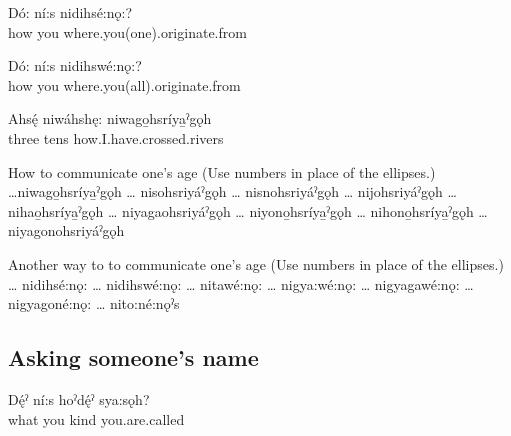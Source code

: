 \ea 
\gll Dó: ní:s nidihsé:nǫ:?\\
how you where.you(one).originate.from\\
\glt {}
\z 

\ea  
\gll Dó: ní:s nidihswé:nǫ:?\\
how you where.you(all).originate.from\\
\glt {}
\z 

\ea  
\gll Ahsę́ niwáhshę: niwago̱hsríya̱ˀgǫh\\
three tens how.I.have.crossed.rivers\\
\glt {}
\z 




\ea How to communicate one's age (Use numbers in place of the ellipses.)\\
\ea …niwago̱hsríya̱ˀgǫh 
\ex … nisohsriyáˀgǫh 
\ex … nisnohsriyáˀgǫh 
\ex … nijohsriyáˀgǫh 
\ex … nihao̱hsríya̱ˀgǫh 
\ex … niyagaohsriyáˀgǫh 
\ex … niyono̱hsríya̱ˀgǫh 
\ex … nihono̱hsríya̱ˀgǫh 
\ex … niyagonohsriyáˀgǫh 
\z
\z

\ea Another way to to communicate one's age (Use numbers in place of the ellipses.)\\
\ea … nidihsé:nǫ: 
\ex … nidihswé:nǫ: 
\ex … nitawé:nǫ: 
\ex … nigya:wé:nǫ: 
\ex … nigyagawé:nǫ: 
\ex … nigyagoné:nǫ: 
\ex … nito:né:nǫˀs  
\z
\z




\subsection{Asking someone’s name}


\ea 
\gll Dę́ˀ ní:s hoˀdę́ˀ sya:sǫh?\\
what you kind you.are.called\\
\glt {}
\z

